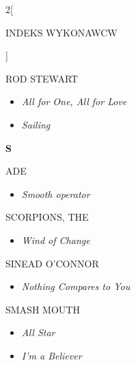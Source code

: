 \documentclass[a4paper]{report}
\begin{document}
\begin{multicols*}{2}[\begin{Huge}INDEKS WYKONAWCW\end{Huge}\vspace{1cm}]
\begin{minipage}{\columnwidth}
\begin{itemize}[topsep=3pt, after=\vspace{3mm}]
	\end{itemize}
\end{minipage}
\begin{minipage}{\columnwidth}
	ROD STEWART 
	\begin{itemize}[topsep=3pt, after=\vspace{3mm}]
		\itemsep0em
		\item[]\textit{All for One, All for Love}  \\
		\item[]  \textit{Sailing}  \\
	\end{itemize}
\end{minipage}
\begin{minipage}{\columnwidth}
	\begin{Large}\textbf{S}\end{Large}ADE 
	\begin{itemize}[topsep=3pt, after=\vspace{3mm}]
		\itemsep0em
		\item[]\textit{Smooth operator}  \\
	\end{itemize}
\end{minipage}
\begin{minipage}{\columnwidth}
	SCORPIONS, THE 
	\begin{itemize}[topsep=3pt, after=\vspace{3mm}]
		\itemsep0em
		\item[]\textit{Wind of Change}  \\
	\end{itemize}
\end{minipage}
\begin{minipage}{\columnwidth}
	SINEAD O'CONNOR 
	\begin{itemize}[topsep=3pt, after=\vspace{3mm}]
		\itemsep0em
		\item[]\textit{Nothing Compares to You}  \\
	\end{itemize}
\end{minipage}
\begin{minipage}{\columnwidth}
	SMASH MOUTH 
	\begin{itemize}[topsep=3pt, after=\vspace{3mm}]
		\itemsep0em
		\item[]\textit{All Star}  \\
		\item[]  \textit{I'm a Believer}  \\

\end{itemize}
\end{minipage}
\end{multicols*}
\end{document}
